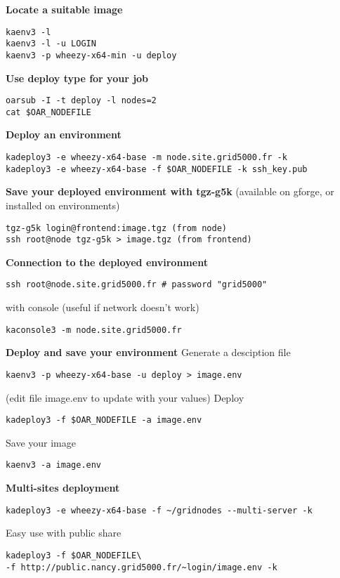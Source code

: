 \textbf{Locate a suitable image}
\begin{lstlisting}
kaenv3 -l
kaenv3 -l -u LOGIN
kaenv3 -p wheezy-x64-min -u deploy
\end{lstlisting}
\makeruleinbox

\textbf{Use deploy type for your job}
\begin{lstlisting}
oarsub -I -t deploy -l nodes=2
cat $OAR_NODEFILE
\end{lstlisting}
\makeruleinbox

\textbf{Deploy an environment}
\begin{lstlisting}
kadeploy3 -e wheezy-x64-base -m node.site.grid5000.fr -k
kadeploy3 -e wheezy-x64-base -f $OAR_NODEFILE -k ssh_key.pub
\end{lstlisting}
\makeruleinbox

\textbf{Save your deployed environment with tgz-g5k}
(available on gforge, or installed on environments)
\begin{lstlisting}
tgz-g5k login@frontend:image.tgz (from node)
ssh root@node tgz-g5k > image.tgz (from frontend)
\end{lstlisting}
\makeruleinbox

\textbf{Connection to the deployed environment}
\begin{lstlisting}
ssh root@node.site.grid5000.fr # password "grid5000"
\end{lstlisting}
with console (useful if network doesn't work)
\begin{lstlisting}
kaconsole3 -m node.site.grid5000.fr
\end{lstlisting}
\makeruleinbox

\textbf{Deploy and save your environment}
Generate a desciption file
\begin{lstlisting}
kaenv3 -p wheezy-x64-base -u deploy > image.env
\end{lstlisting}
(edit file image.env to update with your values)
Deploy
\begin{lstlisting}
kadeploy3 -f $OAR_NODEFILE -a image.env
\end{lstlisting}
Save your image
\begin{lstlisting}
kaenv3 -a image.env
\end{lstlisting}
\makeruleinbox

\textbf{Multi-sites deployment}
\begin{lstlisting}
kadeploy3 -e wheezy-x64-base -f ~/gridnodes --multi-server -k
\end{lstlisting}
Easy use with public share
\begin{lstlisting}
kadeploy3 -f $OAR_NODEFILE\
-f http://public.nancy.grid5000.fr/~login/image.env -k
\end{lstlisting}\vspace{-1.5em}%